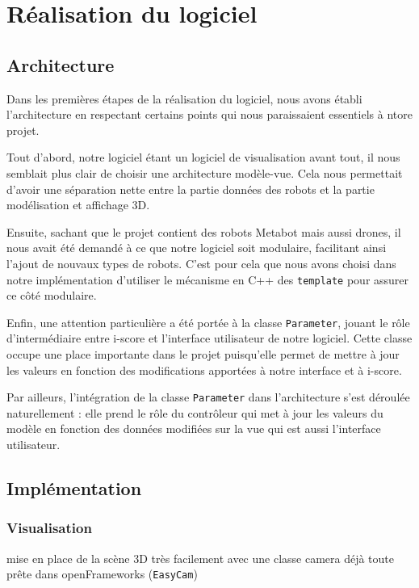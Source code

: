 \section{Réalisation du logiciel}

\subsection{Architecture}
Dans les premières étapes de la réalisation du logiciel, nous avons établi l'architecture en respectant certains points qui nous paraissaient essentiels à ntore projet.

Tout d'abord, notre logiciel étant un logiciel de visualisation avant tout, il nous semblait plus clair de choisir une architecture modèle-vue. Cela nous permettait d'avoir une séparation nette entre la partie données des robots et la partie modélisation et affichage 3D. 

Ensuite, sachant que le projet contient des robots Metabot mais aussi drones, il nous avait été demandé à ce que notre logiciel soit modulaire, facilitant ainsi l'ajout de nouvaux types de robots. C'est pour cela que nous avons choisi dans notre implémentation d'utiliser le mécanisme en C++ des \verb|template| pour assurer ce côté modulaire.

Enfin, une attention particulière a été portée à la classe \verb|Parameter|, jouant le rôle d'intermédiaire entre i-score et l'interface utilisateur de notre logiciel. Cette classe occupe une place importante dans le projet puisqu'elle permet de mettre à jour les valeurs en fonction des modifications apportées à notre interface et à i-score.

Par ailleurs, l'intégration de la classe \verb|Parameter| dans l'architecture s'est déroulée naturellement : elle prend le rôle du contrôleur qui met à jour les valeurs du modèle en fonction des données modifiées sur la vue qui est aussi l'interface utilisateur.

		
\subsection{Implémentation}

\subsubsection{Visualisation}

mise en place de la scène 3D très facilement avec une classe camera déjà toute prête dans openFrameworks (\verb|EasyCam|)

